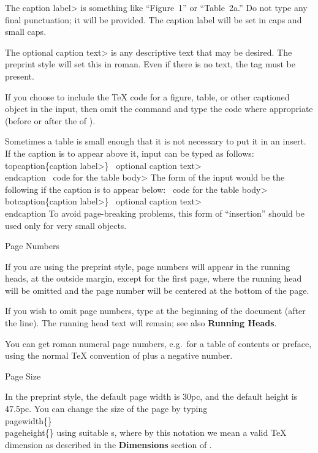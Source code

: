 The \<caption label> is something like ``Figure~1'' or ``Table~2a.''
Do not type any final punctuation; it will be provided.  The caption
label will be set in caps and small caps.

The \<optional caption text> is any descriptive text that may be desired. 
The preprint style will set this in roman.  Even if there is no text, the
 tag must be present.

If you choose to include the \TeX{} code for a figure, table, or other
captioned object in the input, then omit the  command
and type the code where appropriate (before 
or after the  of ).

Sometimes a table is small enough that it is not necessary to put it in an
insert.  If the caption is to appear above it, input can be typed as follows:
\beginexample{}
\\topcaption\{\<caption label>\}
\ \<optional caption text>
\\endcaption
\ \<code for the table body>
\endexample
\noindent
The form of the input would be the following if the caption is to appear below:
\beginexample{}
\ \<code for the table body>
\\botcaption\{\<caption label>\}
\ \<optional caption text>
\\endcaption
\endexample
\noindent
To avoid page-breaking problems,
this form of ``insertion'' should be used only for very small objects.


\subhead Page Numbers \endsubhead

If you are using the preprint style, page numbers will appear in the running
heads, at the outside margin, except for the first page, where the running head
will be omitted and the page number will be centered at the bottom of the page.

If you wish to omit page numbers, type  at the
beginning of the document (after the  line).
The running head text will remain; see also {\bf Running Heads}.

You can get roman numeral page numbers, e.g.\ for a table of contents or
preface, using the normal \TeX{} convention of  plus
a negative number.


\subhead Page Size \endsubhead

In the preprint style, the default page width is 30pc, and the default
height is 47.5pc. 
You can change the size of the page by typing
\beginexample{}
\\pagewidth\{\Dimen\}\newline
\\pageheight\{\Dimen\}
\endexample
\noindent using suitable \Dimen{}s, where by this notation we mean a
valid \TeX{} dimension as described in the {\bf Dimensions} section of
\JoT{}.


